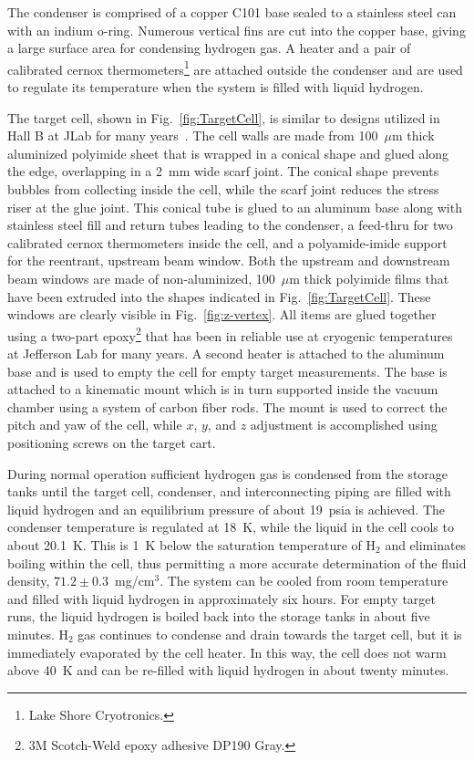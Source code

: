 The condenser is comprised of a copper C101 base
sealed to a stainless steel can with an indium o-ring.  Numerous vertical 
fins are cut into the copper base, giving a large surface area for condensing hydrogen gas.
A heater and a pair of calibrated cernox thermometers\footnote{Lake Shore Cryotronics.}
are attached outside the condenser and are used to regulate its temperature when the
system is filled with liquid hydrogen.

The target cell, shown in Fig.~\ref{fig:TargetCell}, is similar to
designs utilized in Hall B at JLab for many years~\cite{HAKOBYAN2008218}.  
The cell walls are made from 100~$\mu$m thick aluminized
polyimide sheet that is wrapped in a conical shape and glued along the edge,
overlapping in a 2~mm wide scarf joint.  
The conical shape prevents bubbles from collecting inside the cell, while the
scarf joint reduces the stress riser at the glue joint.  This conical
tube is glued to an aluminum base 
along with stainless steel fill and return tubes leading to the condenser, a feed-thru for two calibrated cernox thermometers inside the cell, and a
polyamide-imide support for the reentrant, upstream beam window.  
Both the upstream and downstream beam
windows are made of non-aluminized,
100~$\mu$m thick polyimide films that have been extruded into the
shapes indicated in Fig.~\ref{fig:TargetCell}. These windows are clearly
visible in Fig.~\ref{fig:z-vertex}. All items are glued together using
a two-part epoxy\footnote{3M Scotch-Weld epoxy adhesive DP190 Gray.}
that has been in reliable use at cryogenic temperatures at
Jefferson Lab for many years. 
A second  heater is attached to the aluminum base and
is used to empty the cell for empty target measurements.
The base is attached to a kinematic mount which is in turn
supported inside the vacuum chamber using a system of carbon fiber rods.    
The mount is used to correct the pitch and yaw
of the cell, while $x$, $y$, and $z$ adjustment 
is accomplished using positioning screws on the target cart. 


During normal operation sufficient hydrogen gas is condensed from the storage tanks
until the target cell, condenser, and interconnecting piping are filled with liquid hydrogen
and an equilibrium pressure of about 19~psia is achieved.  
The condenser temperature is regulated at 18~K, while the
liquid in the cell cools to about 20.1~K.  This is 1~K below the saturation
temperature of H$_2$ and eliminates boiling within the cell, thus permitting a more
accurate determination of the fluid density, 
$71.2 \pm 0.3$~mg/cm$^3$.  
The system can be cooled from room temperature and filled with liquid hydrogen in
approximately six hours.  For empty target runs, the liquid hydrogen is boiled back into the storage tanks in about five minutes.  H$_2$ gas continues to condense and drain towards the target cell, but it is immediately 
evaporated by the cell heater.  In this way, the cell does not warm above 40~K and
can be re-filled with liquid hydrogen in about twenty minutes.

